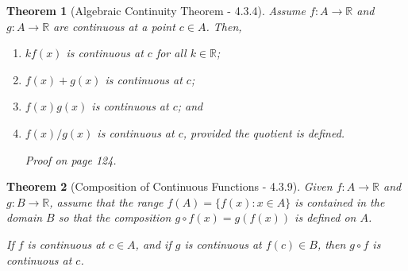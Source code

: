 \documentclass{article}
\newtheorem{theorem}{Theorem}
\begin{document}
\begin{theorem}[Algebraic Continuity Theorem - 4.3.4]
    Assume $f:A\rightarrow \mathbb{R}$ and $g:A\rightarrow \mathbb{R}$ are continuous at a point $c \in A$. Then,
    \begin{enumerate}
        \item $kf(x)$ is continuous at $c$ for all $k \in \mathbb{R}$;
        \item $f(x) + g(x)$ is continuous at $c$;
        \item $f(x)g(x)$ is continuous at $c$; and
        \item $f(x)/g(x)$ is continuous at $c$, provided the quotient is defined.
        
        Proof on page 124.
    \end{enumerate}
\end{theorem}

\begin{theorem}[Composition of Continuous Functions - 4.3.9]
    Given $f:A\rightarrow \mathbb{R}$ and $g:B\rightarrow \mathbb{R}$, assume that the range $f(A) = \{f(x):x\in A\}$ is contained in the domain $B$ so that the composition $g \circ f(x) = g(f(x))$ is defined on $A$.

    If $f$ is continuous at $c \in A$, and if $g$ is continuous at $f(c) \in B$, then $g \circ f$ is continuous at $c$.
\end{theorem}
\end{document}
